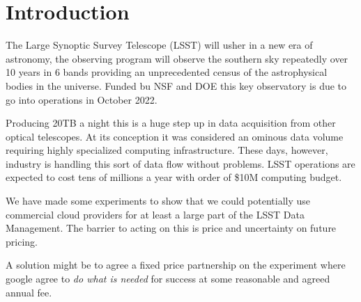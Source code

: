 \section{Introduction}
The Large Synoptic Survey Telescope (\gls{LSST}) will usher in a new era of astronomy, the observing program will observe the southern sky repeatedly over 10 years in 6 bands providing an unprecedented  census of the astrophysical bodies in the universe.  Funded bu \gls{NSF} and \gls{DOE} this key observatory is due to go into operations in October 2022.

Producing 20TB a night this is a huge step up in data acquisition from other optical telescopes. At its conception it was considered an ominous data volume requiring highly specialized computing infrastructure. These days, however, industry is handling this sort of data flow without problems. LSST  operations are expected to cost tens of millions a year with order of \$10M computing budget.

We have made some experiments to show that we could potentially use commercial cloud providers for at least a large part of the \gls{LSST} \gls{Data Management}.  The barrier to acting on this is price and uncertainty on future pricing.

A solution might be to agree a fixed price partnership on the experiment where google agree to \emph{do what is needed} for success at some reasonable and agreed annual fee.





